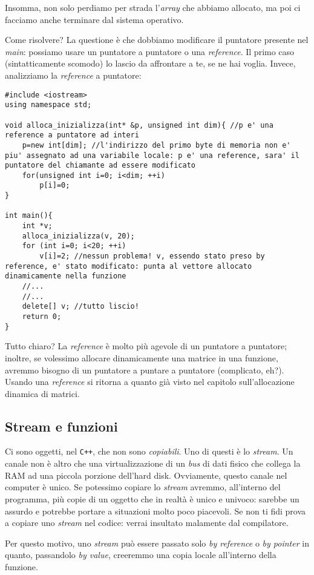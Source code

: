 Insomma, non solo perdiamo per strada l'\emph{array} che abbiamo allocato, ma poi ci facciamo anche terminare dal sistema operativo. 

Come risolvere? La questione è che dobbiamo modificare il puntatore presente nel \emph{main}: possiamo usare un puntatore a puntatore o una \emph{reference}. Il primo caso (sintatticamente scomodo) lo lascio da affrontare a te, se ne hai voglia. Invece, analizziamo la \emph{reference} a puntatore:
\begin{lstlisting}
#include <iostream>
using namespace std;

void alloca_inizializza(int* &p, unsigned int dim){ //p e' una reference a puntatore ad interi
	p=new int[dim]; //l'indirizzo del primo byte di memoria non e' piu' assegnato ad una variabile locale: p e' una reference, sara' il puntatore del chiamante ad essere modificato 
	for(unsigned int i=0; i<dim; ++i)
		p[i]=0;
}

int main(){
	int *v;
	alloca_inizializza(v, 20);
	for (int i=0; i<20; ++i)
		v[i]=2; //nessun problema! v, essendo stato preso by reference, e' stato modificato: punta al vettore allocato dinamicamente nella funzione
	//...
	//...
	delete[] v; //tutto liscio! 
	return 0;
}
\end{lstlisting}

Tutto chiaro? La \emph{reference} è molto più agevole di un puntatore a puntatore; inoltre, se volessimo allocare dinamicamente una matrice in una funzione, avremmo bisogno di un puntatore a puntare a puntatore (complicato, eh?). Usando una \emph{reference} si ritorna a quanto già visto nel capitolo sull'allocazione dinamica di matrici.

\subsection{Stream e funzioni}
Ci sono oggetti, nel \verb|C++|, che non sono \emph{copiabili}. Uno di questi è lo \emph{stream}. Un canale non è altro che una virtualizzazione di un \emph{bus} di dati fisico che collega la RAM ad una piccola porzione dell'hard disk. Ovviamente, questo canale nel computer è unico. Se potessimo copiare lo \emph{stream} avremmo, all'interno del programma, più copie di un oggetto che in realtà è unico e univoco: sarebbe un assurdo e potrebbe portare a situazioni molto poco piacevoli. Se non ti fidi prova a copiare uno \emph{stream} nel codice: verrai insultato malamente dal compilatore.

Per questo motivo, uno \emph{stream} può essere passato solo \emph{by reference} o \emph{by pointer} in quanto, passandolo \emph{by value}, creeremmo una copia locale all'interno della funzione.
